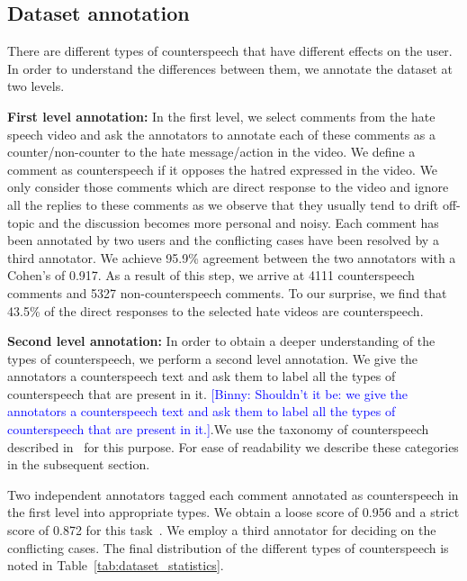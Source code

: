 \documentclass[11pt,a4paper]{article}
\newcommand{\binny}[1]{\textcolor{blue}{[Binny: #1]}}
\begin{document}
{{ 
\subsection{Dataset annotation}

There are different types of counterspeech that have different effects on the user. In order to understand the differences between them, we annotate the dataset at two levels. 

\noindent\textbf{First level annotation:} In the first level, we select comments from the hate speech video and ask the annotators to annotate each of these comments as a counter/non-counter to the hate message/action in the video. We define a comment as counterspeech if it opposes the hatred expressed in the video. We only consider those comments which are direct response to the video and ignore all the replies to these comments as we observe that they usually tend to drift off-topic and the discussion becomes more personal and noisy. Each comment has been annotated by two users and the conflicting cases have been resolved by a third annotator. We achieve 95.9\% agreement between the two annotators with a Cohen's  of 0.917. As a result of this step, we arrive at 4111 counterspeech comments and 5327 non-counterspeech comments. To our surprise, we find that 43.5\%  of the direct responses to the selected hate videos are counterspeech.

\noindent\textbf{Second level annotation:} In order to obtain a deeper understanding of the types of counterspeech, we perform a second level annotation. We give the annotators a counterspeech text and ask them to label all the types of counterspeech that are present in it. \binny{Shouldn't it be: we give the annotators a counterspeech text and ask them to label all the types of counterspeech that are present in it.}.\fi We use the taxonomy of counterspeech described in~\citet{susan2016counterspeech} for this purpose. For ease of readability we describe these categories in the subsequent section. 

Two independent annotators tagged each comment annotated as counterspeech in the first level into appropriate types. We obtain a loose  score of 0.956 and a strict  score of 0.872 for this task~\cite{ravenscroft2016multi}. We employ a third annotator for deciding on the conflicting cases. The final distribution of the different types of counterspeech is noted in Table~\ref{tab:dataset_statistics}.
 








}}
\end{document}
